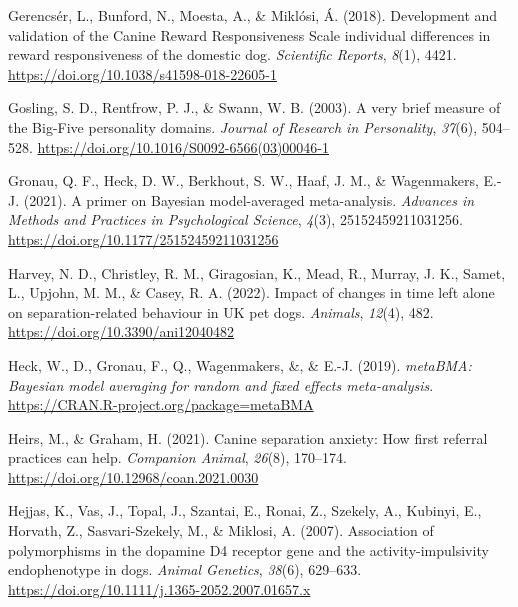 \documentclass[
  pub,floatsintext]{apa6}
\newlength{\cslhangindent}
\newlength{\cslentryspacingunit} %
\newenvironment{CSLReferences}[2] %
 {%
  \setlength{\parindent}{0pt}
  \ifodd #1
  \let\oldpar\par
  \def\par{\hangindent=\cslhangindent\oldpar}
  \fi
  \setlength{\parskip}{#2\cslentryspacingunit}
 }%
 {}
\begin{document}
\begin{CSLReferences}{1}{0}
\leavevmode{}%
Gerencsér, L., Bunford, N., Moesta, A., \& Miklósi, Á. (2018). Development and validation of the {Canine Reward Responsiveness Scale} individual differences in reward responsiveness of the domestic dog. \emph{Scientific Reports}, \emph{8}(1), 4421. \url{https://doi.org/10.1038/s41598-018-22605-1}

\leavevmode{}%
Gosling, S. D., Rentfrow, P. J., \& Swann, W. B. (2003). A very brief measure of the {Big-Five} personality domains. \emph{Journal of Research in Personality}, \emph{37}(6), 504--528. \url{https://doi.org/10.1016/S0092-6566(03)00046-1}

\leavevmode{}%
Gronau, Q. F., Heck, D. W., Berkhout, S. W., Haaf, J. M., \& Wagenmakers, E.-J. (2021). A primer on {Bayesian} model-averaged meta-analysis. \emph{Advances in Methods and Practices in Psychological Science}, \emph{4}(3), 25152459211031256. \url{https://doi.org/10.1177/25152459211031256}

\leavevmode{}%
Harvey, N. D., Christley, R. M., Giragosian, K., Mead, R., Murray, J. K., Samet, L., Upjohn, M. M., \& Casey, R. A. (2022). Impact of changes in time left alone on separation-related behaviour in {UK} pet dogs. \emph{Animals}, \emph{12}(4), 482. \url{https://doi.org/10.3390/ani12040482}

\leavevmode{}%
Heck, W., D., Gronau, F., Q., Wagenmakers, \&, \& E.-J. (2019). \emph{metaBMA: Bayesian model averaging for random and fixed effects meta-analysis}. \href{https://CRAN.R-project.org/package=metaBMA\%20}{https://CRAN.R-project.org/package=metaBMA }

\leavevmode{}%
Heirs, M., \& Graham, H. (2021). Canine separation anxiety: How first referral practices can help. \emph{Companion Animal}, \emph{26}(8), 170--174. \url{https://doi.org/10.12968/coan.2021.0030}

\leavevmode{}%
Hejjas, K., Vas, J., Topal, J., Szantai, E., Ronai, Z., Szekely, A., Kubinyi, E., Horvath, Z., Sasvari-Szekely, M., \& Miklosi, A. (2007). Association of polymorphisms in the dopamine {D4} receptor gene and the activity-impulsivity endophenotype in dogs. \emph{Animal Genetics}, \emph{38}(6), 629--633. \url{https://doi.org/10.1111/j.1365-2052.2007.01657.x}


\end{CSLReferences}
\end{document}
